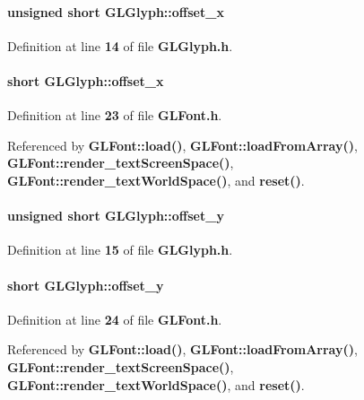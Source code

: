 \paragraph[{offset\+\_\+x}]{\setlength{\rightskip}{0pt plus 5cm}unsigned short G\+L\+Glyph\+::offset\+\_\+x}\label{structGLGlyph_a72830018d3d4f0fe55ec295c06c396e7}


Definition at line {\bf 14} of file {\bf G\+L\+Glyph.\+h}.

\paragraph[{offset\+\_\+x}]{\setlength{\rightskip}{0pt plus 5cm}short G\+L\+Glyph\+::offset\+\_\+x}\label{structGLGlyph_a8c3b2aba82134cd2a910387b9ebd78bc}


Definition at line {\bf 23} of file {\bf G\+L\+Font.\+h}.



Referenced by {\bf G\+L\+Font\+::load()}, {\bf G\+L\+Font\+::load\+From\+Array()}, {\bf G\+L\+Font\+::render\+\_\+text\+Screen\+Space()}, {\bf G\+L\+Font\+::render\+\_\+text\+World\+Space()}, and {\bf reset()}.

\paragraph[{offset\+\_\+y}]{\setlength{\rightskip}{0pt plus 5cm}unsigned short G\+L\+Glyph\+::offset\+\_\+y}\label{structGLGlyph_a7c22734c219dd2fd0d0836afd617d69f}


Definition at line {\bf 15} of file {\bf G\+L\+Glyph.\+h}.

\paragraph[{offset\+\_\+y}]{\setlength{\rightskip}{0pt plus 5cm}short G\+L\+Glyph\+::offset\+\_\+y}\label{structGLGlyph_aee3d3b2cb3435260c1b2d785dec9421f}


Definition at line {\bf 24} of file {\bf G\+L\+Font.\+h}.



Referenced by {\bf G\+L\+Font\+::load()}, {\bf G\+L\+Font\+::load\+From\+Array()}, {\bf G\+L\+Font\+::render\+\_\+text\+Screen\+Space()}, {\bf G\+L\+Font\+::render\+\_\+text\+World\+Space()}, and {\bf reset()}.

